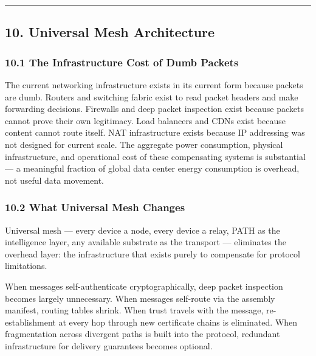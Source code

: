 \documentclass[
  11pt,
]{article}
\begin{document}
\begin{center}\rule{0.5\linewidth}{0.5pt}\end{center}

\hypertarget{universal-mesh-architecture}{%
\subsection{10. Universal Mesh
Architecture}\label{universal-mesh-architecture}}

\hypertarget{the-infrastructure-cost-of-dumb-packets}{%
\subsubsection{10.1 The Infrastructure Cost of Dumb
Packets}\label{the-infrastructure-cost-of-dumb-packets}}

The current networking infrastructure exists in its current form because
packets are dumb. Routers and switching fabric exist to read packet
headers and make forwarding decisions. Firewalls and deep packet
inspection exist because packets cannot prove their own legitimacy. Load
balancers and CDNs exist because content cannot route itself. NAT
infrastructure exists because IP addressing was not designed for current
scale. The aggregate power consumption, physical infrastructure, and
operational cost of these compensating systems is substantial --- a
meaningful fraction of global data center energy consumption is
overhead, not useful data movement.

\hypertarget{what-universal-mesh-changes}{%
\subsubsection{10.2 What Universal Mesh
Changes}\label{what-universal-mesh-changes}}

Universal mesh --- every device a node, every device a relay, PATH as
the intelligence layer, any available substrate as the transport ---
eliminates the overhead layer: the infrastructure that exists purely to
compensate for protocol limitations.

When messages self-authenticate cryptographically, deep packet
inspection becomes largely unnecessary. When messages self-route via the
assembly manifest, routing tables shrink. When trust travels with the
message, re-establishment at every hop through new certificate chains is
eliminated. When fragmentation across divergent paths is built into the
protocol, redundant infrastructure for delivery guarantees becomes
optional.
\end{document}
